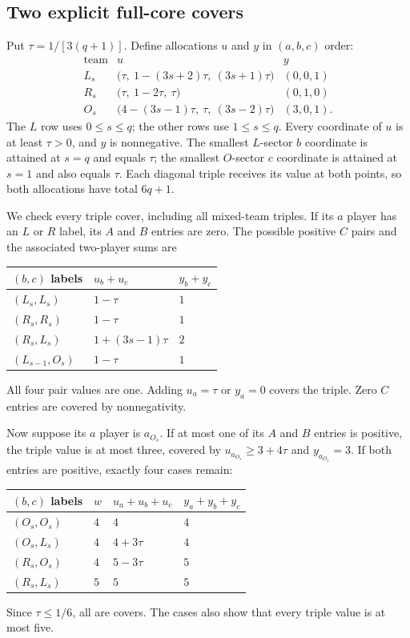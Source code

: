 \documentclass[11pt]{article}
\theoremstyle{remark}\newtheorem{remark}[theorem]{Remark}
\begin{document}
\subsection{Two explicit full-core covers}
Put $\tau=1/[3(q+1)]$. Define allocations $u$ and $y$ in $(a,b,c)$ order:
\begin{equation}\label{eq:witnesses}
\begin{array}{c|c|c}
\text{team}&u&y\\\hline
L_s&\bigl(\tau,\ 1-(3s+2)\tau,\ (3s+1)\tau\bigr)&(0,0,1)\\
R_s&\bigl(\tau,\ 1-2\tau,\ \tau\bigr)&(0,1,0)\\
O_s&\bigl(4-(3s-1)\tau,\ \tau,\ (3s-2)\tau\bigr)&(3,0,1).
\end{array}
\end{equation}
The $L$ row uses $0\leq s\leq q$; the other rows use $1\leq s\leq q$.
Every coordinate of $u$ is at least $\tau>0$, and $y$ is nonnegative.
The smallest $L$-sector $b$ coordinate is attained at $s=q$ and equals
$\tau$; the smallest $O$-sector $c$ coordinate is attained at $s=1$
and also equals $\tau$. Each diagonal triple receives its value at
both points, so both allocations have total $6q+1$.

We check every triple cover, including all mixed-team triples. If its
$a$ player has an $L$ or $R$ label, its $A$ and $B$ entries are zero.
The possible positive $C$ pairs and the associated two-player sums are
\begin{center}
\begin{tabular}{lll}\toprule
$(b,c)$ labels & $u_b+u_c$ & $y_b+y_c$\\\midrule
$(L_s,L_s)$ & $1-\tau$ & $1$\\
$(R_s,R_s)$ & $1-\tau$ & $1$\\
$(R_s,L_s)$ & $1+(3s-1)\tau$ & $2$\\
$(L_{s-1},O_s)$ & $1-\tau$ & $1$\\\bottomrule
\end{tabular}
\end{center}
All four pair values are one. Adding $u_a=\tau$ or $y_a=0$ covers the
triple. Zero $C$ entries are covered by nonnegativity.

Now suppose its $a$ player is $a_{O_s}$. If at most one of its $A$ and
$B$ entries is positive, the triple value is at most three, covered by
$u_{a_{O_s}}\geq3+4\tau$ and $y_{a_{O_s}}=3$.
If both entries are positive, exactly four cases remain:
\begin{center}
\begin{tabular}{llll}\toprule
$(b,c)$ labels & $w$ & $u_a+u_b+u_c$ & $y_a+y_b+y_c$\\\midrule
$(O_s,O_s)$ & $4$ & $4$ & $4$\\
$(O_s,L_s)$ & $4$ & $4+3\tau$ & $4$\\
$(R_s,O_s)$ & $4$ & $5-3\tau$ & $5$\\
$(R_s,L_s)$ & $5$ & $5$ & $5$\\\bottomrule
\end{tabular}
\end{center}
Since $\tau\leq1/6$, all are covers. The cases also show that every
triple value is at most five.
\end{document}
